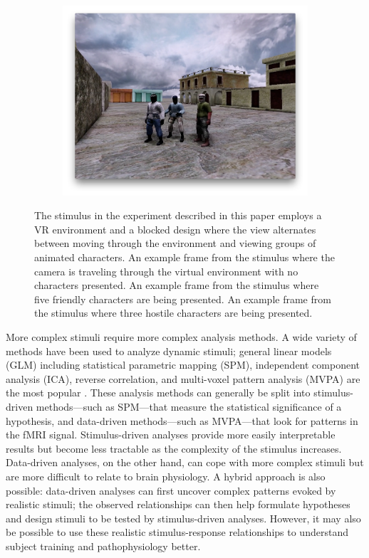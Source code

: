 \documentclass[preprint,5p,authoryear]{elsarticle}
\begin{document}
\begin{figure}
\begin{subfigure}{0.3\textwidth}
\includegraphics[width=\textwidth]{figures/stimulus-three-insurgents}
\caption{}
\label{fig:stimulus-three-insurgents}
\end{subfigure}
\caption{
The stimulus in the experiment described in this paper employs a VR environment and a blocked design where the view alternates between moving through the environment and viewing groups of animated characters.
 An example frame from the stimulus where the camera is traveling through the virtual environment with no characters presented.
 An example frame from the stimulus where five friendly characters are being presented.
 An example frame from the stimulus where three hostile characters are being presented.}
\label{fig:stimulus}
\end{figure}

More complex stimuli require more complex analysis methods.
A wide variety of methods have been used to analyze dynamic stimuli; general linear models (GLM) including statistical parametric mapping (SPM), independent component analysis (ICA), reverse correlation, and multi-voxel pattern analysis (MVPA) are the most popular \citep{Spiers2007}.
These analysis methods can generally be split into stimulus-driven methods---such as SPM---that measure the statistical significance of a hypothesis, and data-driven methods---such as MVPA---that look for patterns in the fMRI signal.
Stimulus-driven analyses provide more easily interpretable results but become less tractable as the complexity of the stimulus increases.
Data-driven analyses, on the other hand, can cope with more complex stimuli but are more difficult to relate to brain physiology.
A hybrid approach is also possible: data-driven analyses can first uncover complex patterns evoked by realistic stimuli; the observed relationships can then help formulate hypotheses and design stimuli to be tested by stimulus-driven analyses. 
However, it may also be possible to use these realistic stimulus-response relationships to understand subject training and pathophysiology better.
\end{document}

